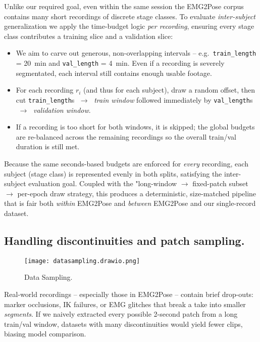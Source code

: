 Unlike our required goal, even within the same session the EMG2Pose corpus contains many short recordings of discrete stage classes.
To evaluate \emph{inter-subject} generalization we apply the time-budget logic \emph{per recording}, ensuring every stage class contributes a training slice and a validation slice:

\begin{itemize}
  \item We aim to carve out generous, non-overlapping intervals -- 
        e.g.\ \texttt{train\_length} = \SI{20}{min} and
        \texttt{val\_length} = \SI{4}{min}.
        Even if a recording is severely segmentated, each interval still contains enough usable footage.

  \item For each recording $r_{i}$ (and thus for each subject), draw  
        a random offset, then cut
        \texttt{train\_length}s $\;\to\;$ \emph{train window}
        followed immediately by
        \texttt{val\_length}s $\;\to\;$ \emph{validation window}.

  \item If a recording is too short for both windows, it is skipped; the global
        budgets are re-balanced across the remaining recordings so the overall
        train/val duration is still met.
\end{itemize}

Because the same seconds-based budgets are enforced for \emph{every} recording, each subject (stage class) is represented evenly in both splits, satisfying the inter-subject evaluation goal. Coupled with the "long-window $\to$ fixed-patch subset $\to$ per-epoch draw strategy, this produces a deterministic, size-matched pipeline that is fair both \emph{within} EMG2Pose and \emph{between} EMG2Pose and our single-record dataset.

\subsection{Handling discontinuities and patch sampling.}

\begin{figure}[H]
    \centering
    \texttt{[image: datasampling.drawio.png]}
    \caption{Data Sampling.}
    \label{fig:datasampling}
\end{figure}

Real-world recordings -- especially those in EMG2Pose -- contain brief drop-outs:
marker occlusions, IK failures, or EMG glitches that break a take into smaller \emph{segments}.
If we naively extracted every possible 2-second patch from a long train/val window, datasets with many discontinuities would yield fewer clips, biasing model comparison.

